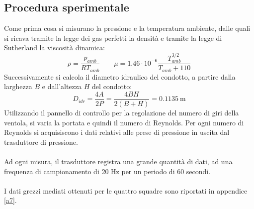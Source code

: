 \newpage
\subsection{Procedura sperimentale}
Come prima cosa si misurano la pressione e la temperatura ambiente, dalle quali si ricava tramite la legge dei gas perfetti la densità e tramite la legge di Sutherland la viscosità dinamica:
\begin{equation*}
    \rho = \frac{p_{amb}}{RT_{amb}} \qquad \mu = 1.46\cdot10^{-6} \frac{T_{amb}^{3/2}}{T_{amb}+110} 
\end{equation*}
Successivamente si calcola il diametro idraulico del condotto, a partire dalla larghezza $B$ e dall'altezza $H$ del condotto:
\begin{equation*}
    D_{idr} = \frac{4A}{2P} = \frac{4BH}{2(B+H)} = 0.1135\ \text{m}
\end{equation*}
Utilizzando il pannello di controllo per la regolazione del numero di giri della ventola, si varia la portata e quindi il numero di Reynolds. Per ogni numero di Reynolds si acquisiscono i dati relativi alle prese di pressione in uscita dal trasduttore di pressione.\\\\
Ad ogni misura, il trasduttore registra una grande quantità di dati, ad una frequenza di campionamento di 20 Hz per un periodo di 60 secondi.\\\\
I dati grezzi mediati ottenuti per le quattro squadre sono riportati in appendice \ref{a7}.

